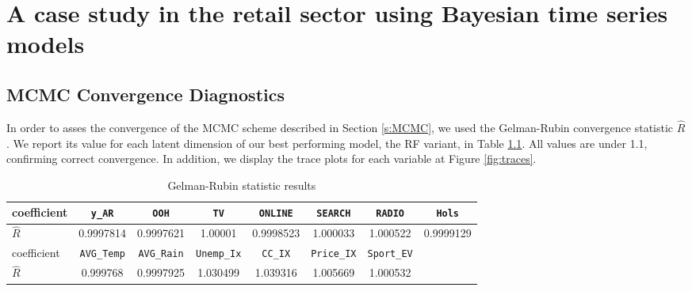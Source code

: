\chapter{A case study in the retail sector using Bayesian time series models}  \label{app:GR}

\section{MCMC Convergence Diagnostics} 

In order to asses the convergence of the MCMC scheme described in Section \ref{s:MCMC}, we used the Gelman-Rubin convergence statistic $\hat{R}$. We report its value for each latent dimension of our best performing model, the RF variant, in Table \ref{tab:GR}. All values are under 1.1, confirming correct convergence. In addition, we display the trace plots for each variable at Figure \ref{fig:traces}.


\begin{table}[H]
\centering
{\footnotesize 
\begin{tabular}{|l|c|c|c|c|c|c|c|}
\hline
coefficient & \texttt{y\_AR} & \texttt{OOH} & \texttt{TV} & \texttt{ONLINE} & \texttt{SEARCH} & \texttt{RADIO} & \texttt{Hols} \\
\hline 
$\hat{R}$ & 0.9997814 & 0.9997621 & 1.00001 & 0.9998523 & 1.000033 & 1.000522 & 0.9999129 \\
\hline
coefficient & \texttt{AVG\_Temp} & \texttt{AVG\_Rain} & \texttt{Unemp\_Ix} & \texttt{CC\_IX} &  \texttt{Price\_IX}& \texttt{Sport\_EV}  & \\
\hline
$\hat{R}$ & 0.999768 & 0.9997925 & 1.030499 & 1.039316 & 1.005669 & 1.000532 & \\
\hline
\end{tabular}\caption{Gelman-Rubin statistic results}\label{tab:GR}
}
\end{table}



